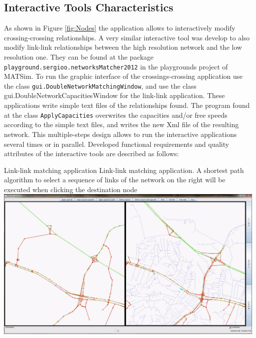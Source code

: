 \subsection{Interactive Tools Characteristics}
As shown in Figure \ref{fig:Nodes} the application allows to interactively modify crossing-crossing relationships. A very similar interactive tool was develop to also modify link-link relationships between the high resolution network and the low resolution one. They can be found at the package \lstinline|playground.sergioo.networksMatcher2012| in the playgrounds project of MATSim. To run the graphic interface of the crossings-crossing application use the class \lstinline|gui.DoubleNetworkMatchingWindow|, and use the class gui.DoubleNetworkCapacitiesWindow for the link-link application. These applications write simple text files of the relationships found. The program found at the class \lstinline|ApplyCapacities| overwrites the capacities and/or free speeds according to the simple text files, and writes the new Xml file of the resulting network. This multiple-steps design allows to run the interactive applications several times or in parallel. Developed functional requirements and quality attributes of the interactive tools are described as follows:

\createfigure
{Link-link matching application}
{Link-link matching application. A shortest path algorithm to select a sequence of links of the network on the right will be executed when clicking the destination node}
{\label{fig:Links}}
{\includegraphics[width=1.0\textwidth]{extending/figures/netEdSing/Links.png}}
{}

